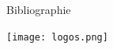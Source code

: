 \documentclass[final]{beamer}
\newlength{\onecolwid}
\begin{document}
\begin{frame}[t]
\begin{columns}[t]
\begin{column}{\onecolwid}
\begin{block}{Bibliographie}
\begin{minipage}{1.49\textwidth}
  \begin{center}

      \vspace{-4cm}
      \hspace{6cm}
      \texttt{[image: logos.png]}
  \end{center}
    \end{minipage}
\end{block}


\end{column} %

\end{columns} %

\end{frame} %
\end{document}
